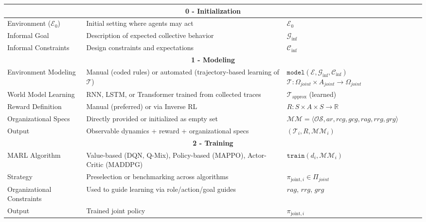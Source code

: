 \begin{table}[h!]
    \centering
    \renewcommand{\arraystretch}{1.3}
    \begin{tabular}{|l|p{8cm}|p{3.5cm}|}
        \hline
        \multicolumn{3}{|c|}{\textbf{0 - Initialization}} \\ \hline
        Environment ($\mathcal{E}_0$) & Initial setting where agents may act & $\mathcal{E}_0$ \\ \hline
        Informal Goal & Description of expected collective behavior & $\mathcal{G}_{\text{inf}}$ \\ \hline
        Informal Constraints & Design constraints and expectations & $\mathcal{C}_{\text{inf}}$ \\ \hline

        \multicolumn{3}{|c|}{\textbf{1 - Modeling}} \\ \hline
        Environment Modeling & Manual (coded rules) or automated (trajectory-based learning of $\mathcal{T}$) & $\texttt{model}(\mathcal{E}, \mathcal{G}_{\text{inf}}, \mathcal{C}_{\text{inf}})$ \newline $\mathcal{T} : \Omega_{joint} \times A_{joint} \to \Omega_{joint}$ \\ \hline
        World Model Learning & RNN, LSTM, or Transformer trained from collected traces & $\mathcal{T}_{\text{approx}}$ (learned) \\ \hline
        Reward Definition & Manual (preferred) or via Inverse RL & $R : S \times A \times S \to \mathbb{R}$ \\ \hline
        Organizational Specs & Directly provided or initialized as empty set & $\mathcal{MM} = \langle \mathcal{OS}, ar, rcg, gcg, rag, rrg, grg \rangle$ \\ \hline
        Output & Observable dynamics + reward + organizational specs & $(\mathcal{T}_i, R, \mathcal{MM}_i)$ \\ \hline

        \multicolumn{3}{|c|}{\textbf{2 - Training}} \\ \hline
        MARL Algorithm & Value-based (DQN, Q-Mix), Policy-based (MAPPO), Actor-Critic (MADDPG) & $\texttt{train}(d_i, \mathcal{MM}_i)$ \\ \hline
        Strategy & Preselection or benchmarking across algorithms & $\pi_{\text{joint}, i} \in \Pi_{joint}$ \\ \hline
        Organizational Constraints & Used to guide learning via role/action/goal guides & $rag$, $rrg$, $grg$ \\ \hline
        Output & Trained joint policy & $\pi_{\text{joint}, i}$ \\ \hline


\end{tabular}
\end{table}
